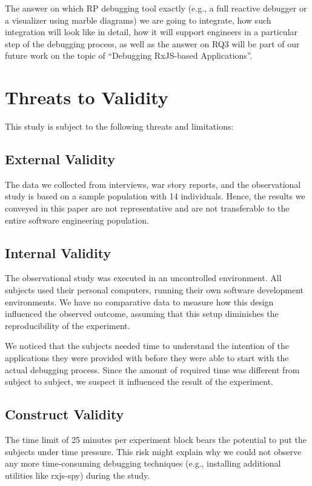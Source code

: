 \documentclass[sigplan,screen,review]{acmart}
\begin{document}
The answer on which RP debugging tool exactly (e.g., a full reactive debugger or a visualizer using marble diagrams) we are going to integrate, how such integration will look like in detail, how it will support engineers in a particular step of the debugging process, as well as the answer on RQ3 will be part of our future work on the topic of ``Debugging RxJS-based Applications''.


\section{Threats to Validity}
\label{sec:threats}

This study is subject to the following threats and limitations:

\subsection{External Validity}

The data we collected from interviews, war story reports, and the observational study is based on a sample population with 14 individuals. Hence, the results we conveyed in this paper are not representative and are not transferable to the entire software engineering population.

\subsection{Internal Validity}

The observational study was executed in an uncontrolled environment. All subjects used their personal computers, running their own software development environments. We have no comparative data to measure how this design influenced the observed outcome, assuming that this setup diminishes the reproducibility of the experiment.

We noticed that the subjects needed time to understand the intention of the applications they were provided with before they were able to start with the actual debugging process. Since the amount of required time was different from subject to subject, we suspect it influenced the result of the experiment.

\subsection{Construct Validity}

The time limit of 25 minutes per experiment block bears the potential to put the subjects under time pressure. This risk might explain why we could not observe any more time-consuming debugging techniques (e.g., installing additional utilities like rxjs-spy) during the study.
\end{document}
